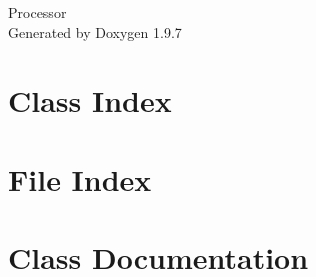\documentclass[twoside]{book}
\newcommand{\+}{\discretionary{\mbox{\scriptsize$\hookleftarrow$}}{}{}}
\newcommand{\clearemptydoublepage}{%
    \newpage{\pagestyle{empty}\cleardoublepage}%
  }
\begin{document}
  \raggedbottom
    \hypersetup{pageanchor=false,
                bookmarksnumbered=true,
                pdfencoding=unicode
               }
  \begin{titlepage}
  \vspace*{7cm}
  \begin{center}%
  {\Large Processor}\\
  \vspace*{1cm}
  {\large Generated by Doxygen 1.9.7}\\
  \end{center}
  \end{titlepage}
  \clearemptydoublepage
  \tableofcontents
  \clearemptydoublepage
  \hypersetup{pageanchor=true}

\chapter{Class Index}

\chapter{File Index}

\chapter{Class Documentation}




















\end{document}
